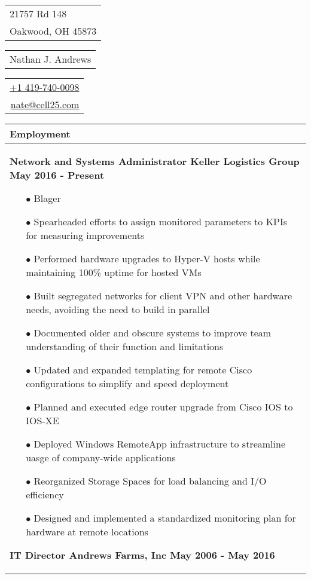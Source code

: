 \documentclass{article}
\begin{document}
\sffamily%
{\small\begin{tabular}[c]{l}
  21757 Rd 148 \\
  Oakwood, OH 45873
\end{tabular}}\hfill%
{\Large\bfseries\begin{tabular}[c]{c}
  Nathan J. Andrews
\end{tabular}}\hfill%
{\small\begin{tabular}[c]{r}
  \href{tel:14197400098}{+1 419-740-0098} \\
  \href{mailto:nate@cell25.com}{nate@cell25.com}
\end{tabular}}%

\bigskip

\begin{tabular}{p{\dimexpr\linewidth-2\tabcolsep}}
  \textbf{Employment} \\
  \hline
  {\bfseries Network and Systems Administrator \hfill Keller Logistics Group \qquad \qquad \qquad May 2016 - Present}
  \begin{itemize}
  	\item[$\bullet$]Blager
  	\item[$\bullet$]Spearheaded efforts to assign monitored parameters to KPIs for measuring improvements
  	\item[$\bullet$]Performed hardware upgrades to Hyper-V hosts while maintaining 100\% uptime for hosted VMs
  	\item[$\bullet$]Built segregated networks for client VPN and other hardware needs, avoiding the need to build in parallel
  	\item[$\bullet$]Documented older and obscure systems to improve team understanding of their function and limitations
  	\item[$\bullet$]Updated and expanded templating for remote Cisco configurations to simplify and speed deployment
  	\item[$\bullet$]Planned and executed edge router upgrade from Cisco IOS to IOS-XE
  	\item[$\bullet$]Deployed Windows RemoteApp infrastructure to streamline uasge of company-wide applications
  	\item[$\bullet$]Reorganized Storage Spaces for load balancing and I/O efficiency
  	\item[$\bullet$]Designed and implemented a standardized monitoring plan for hardware at remote locations
  \end{itemize}
  {\bfseries IT Director \hfill Andrews Farms, Inc \qquad \qquad \qquad May 2006 - May 2016} 

\end{tabular}
\end{document}

